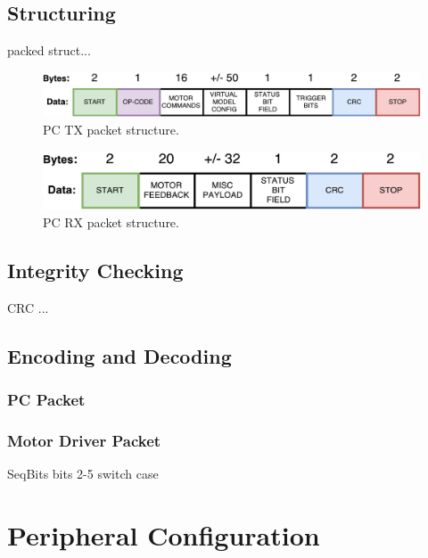 \subsection{Structuring}
packed struct...

\begin{figure}
\centering
\includegraphics[clip, trim=0cm 0cm 0cm 0cm, page = 1, width=1\textwidth]{images/comms/pc-tx-packet.pdf} 
\caption{PC TX packet structure.}
\label{fig:pc-tx-packet}
\end{figure}

\begin{figure}
\centering
\includegraphics[clip, trim=0cm 0cm 0cm 0cm, page = 1, width=1\textwidth]{images/comms/pc-rx-packet.pdf} 
\caption{PC RX packet structure.}
\label{fig:pc-rx-packet}
\end{figure}


\subsection{Integrity Checking}
CRC ...

\subsection{Encoding and Decoding}
\subsubsection{PC Packet}
\subsubsection{Motor Driver Packet}
SeqBits bits 2-5 switch case


\section{Peripheral Configuration}

